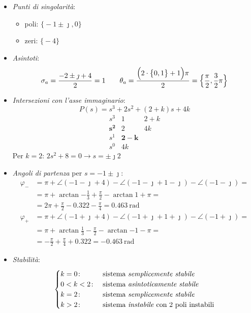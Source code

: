 \begin{esercizio}
\begin{itemize}
	\item \emph{Punti di singolarità}:
		\begin{itemize}
			\item poli: \(\bigl\{-1\pm\jmath,0\bigr\}\)
			\item zeri: \(\bigl\{-4\bigr\}\)
		\end{itemize}
	\item \emph{Asintoti}:
		\[
			\sigma_a = \frac{-2\pm\jmath+4}{2} = 1 \qquad
			\theta_a = \frac{\Bigl(2\cdot\bigl\{0,1\bigr\}+1\Bigr)\pi}{2} = \Bigl\{\frac{\pi}{2},\frac{3}{2}\pi\Bigr\}
		\]
	\item \emph{Intersezioni con l'asse immaginario}:
		\[
			P(s) = s^3 + 2s^2 +(2+k)s +4k
		\]
		\[\begin{array}{r|rr}
			s^3 & 1 & 2+k 	   \\
			\bm{s^2} & 2 & 4k  \\
			s^1 & \bm{2-k} 	   \\
			s^0 & 4k
		\end{array}\]
		Per \(k=2\): \(2s^2+8=0 \rightarrow s=\pm\jmath2\)
	\item \emph{Angoli di partenza} per \(s=-1\pm\jmath\):
		\begin{align*}
			\varphi_- &= \pi +\angle(-1-\jmath+4) -\angle(-1-\jmath+1-\jmath) -\angle(-1-\jmath) = \\
				  &= \pi +\arctan{-\frac{1}{3}} +\frac{\pi}{2} -\arctan{1} +\pi = \\
				  &= 2\pi +\frac{\pi}{2} -0.322 -\frac{\pi}{4} = \SI{0.463}{\radian} \\
			\varphi_+ &= \pi +\angle(-1+\jmath+4) -\angle(-1+\jmath+1+\jmath) -\angle(-1+\jmath) = \\
				  &= \pi +\arctan{\frac{1}{3}} -\frac{\pi}{2} -\arctan{-1} -\pi = \\
				  &= -\frac{\pi}{2} +\frac{\pi}{4} +0.322 = \SI{-0.463}{\radian}
		\end{align*}
	\item \emph{Stabilità}:
		\[\begin{cases}
			k = 0\colon & \text{sistema \emph{semplicemente stabile}} \\
			0 < k < 2\colon & \text{sistema \emph{asintoticamente stabile}} \\
			k = 2\colon & \text{sistema \emph{semplicemente stabile}} \\
			k > 2\colon & \text{sistema \emph{instabile} con 2 poli instabili}
		\end{cases}\]
\end{itemize}
\end{esercizio}

